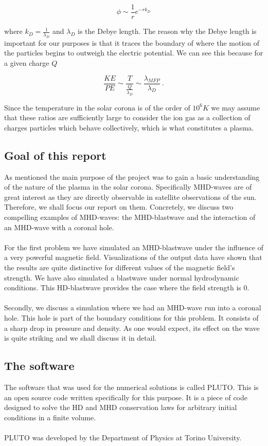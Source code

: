$$ \phi  \sim \frac{1}{r} e^{-r k_D}$$

where $k_D = \frac{1}{\lambda_D}$ and $ \lambda_D $ is the Debye length. The reason why the Debye length is important for our purposes is that it traces the boundary of where the motion of the particles begins to outweigh the electric potential. We can see this because for a given charge $Q$ 

$$ \frac{KE}{PE}  \sim \frac{T}{\frac{Q}{\lambda_D}}  \sim \frac{\lambda_{MFP}}{\lambda_D} \ .$$

Since the temperature in the solar corona is of the order of $10^6 K$ we may assume that these ratios are sufficiently large to consider the ion gas as a collection of charges particles which behave collectively, which is what constitutes a plasma.

\subsection*{Goal of this report}

As mentioned the main purpose of the project was to gain a basic understanding of the nature of the plasma in the solar corona. Specifically MHD-waves are of great interest as they are directly observable in satellite observations of the sun. Therefore, we shall focus our report on them. Concretely, we discuss two compelling examples of MHD-waves: the MHD-blastwave and the interaction of an MHD-wave with a coronal hole.\\
\\
For the first problem we have simulated an MHD-blastwave under the influence of a very powerful magnetic field. Visualizations of the output data have shown that the results are quite distinctive for different values of the magnetic field's strength. We have also simulated a blastwave under normal hydrodynamic conditions. This HD-blastwave provides the case where the field strength is $0$.\\
\\
Secondly, we discuss a simulation where we had an MHD-wave run into a coronal hole. This hole is part of the boundary conditions for this problem. It consists of a sharp drop in pressure and density. As one would expect, its effect on the wave is quite striking and we shall discuss it in detail.

\subsection*{The software}

The software that was used for the numerical solutions is called PLUTO. This is an open source code written specifically for this purpose. It is a piece of code designed to solve the HD and MHD conservation laws for arbitrary initial conditions in a finite volume.\\
\\
PLUTO was developed by the Department of Physics at Torino University. 


